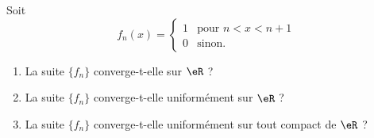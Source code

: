 

\begin{exercice}\label{exo113}

Soit 
\begin{equation}
	f_n(x)=
\begin{cases}
	1	&	\text{pour }n<x<n+1\\
	0	&	 \text{sinon.}
\end{cases}
\end{equation}

\begin{enumerate}
\item La suite $\{ f_n \}$ converge-t-elle sur $\eR$ ?
\item La suite $\{ f_n \}$ converge-t-elle uniformément sur $\eR$ ?
\item La suite $\{ f_n \}$ converge-t-elle uniformément sur tout compact de $\eR$ ?
\end{enumerate}

\end{exercice}
